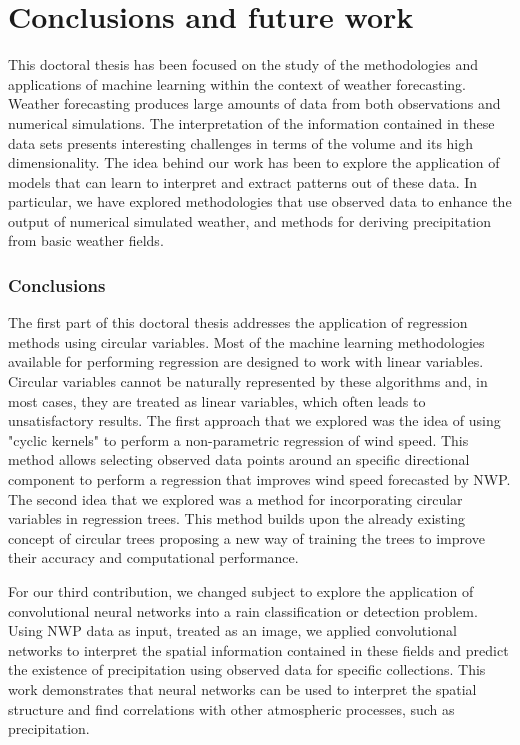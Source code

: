 
\chapter{Conclusions and future work} %

\label{Chapter3}

This doctoral thesis has been focused on the study of the methodologies and applications of machine learning within the context of weather forecasting. Weather forecasting produces large amounts of data from both observations and numerical simulations. The interpretation of the information contained in these data sets presents interesting challenges in terms of the volume and its high dimensionality. The idea behind our work has been to explore the application of models that can learn to interpret and extract patterns out of these data. In particular, we have explored methodologies that use observed data to enhance the output of numerical simulated weather, and methods for deriving precipitation from basic weather fields. 

\subsection{Conclusions}

The first part of this doctoral thesis addresses the application of regression methods using circular variables. Most of the machine learning methodologies available for performing regression are designed to work with linear variables. Circular variables cannot be naturally represented by these algorithms and, in most cases, they are treated as linear variables, which often leads to unsatisfactory results. The first approach that we explored was the idea of using "cyclic kernels" to perform a non-parametric regression of wind speed. This method allows selecting observed data points around an specific directional component to perform a regression that improves wind speed forecasted by NWP. The second idea that we explored was a method for incorporating circular variables in regression trees. This method builds upon the already existing concept of circular trees proposing a new way of training the trees to improve their accuracy and computational performance.

\medskip

For our third contribution, we changed subject to explore the application of convolutional neural networks into a rain classification or detection problem. Using NWP data as input, treated as an image, we applied convolutional networks to interpret the spatial information contained in these fields and predict the existence of precipitation using observed data for specific collections. This work demonstrates that neural networks can be used to interpret the spatial structure and find correlations with other atmospheric processes, such as precipitation.  

